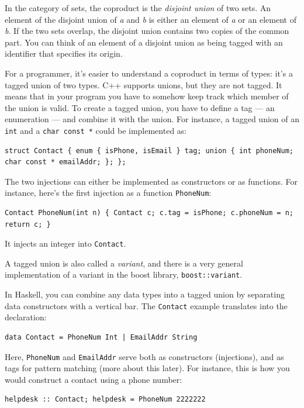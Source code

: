 In the category of sets, the coproduct is the \emph{disjoint union} of
two sets. An element of the disjoint union of \emph{a} and \emph{b} is
either an element of \emph{a} or an element of \emph{b}. If the two sets
overlap, the disjoint union contains two copies of the common part. You
can think of an element of a disjoint union as being tagged with an
identifier that specifies its origin.

For a programmer, it's easier to understand a coproduct in terms of
types: it's a tagged union of two types. C++ supports unions, but they
are not tagged. It means that in your program you have to somehow keep
track which member of the union is valid. To create a tagged union, you
have to define a tag --- an enumeration --- and combine it with the
union. For instance, a tagged union of an \texttt{int} and a
\texttt{char\ const\ *} could be implemented as:

\begin{verbatim}
struct Contact { enum { isPhone, isEmail } tag; union { int phoneNum; char const * emailAddr; }; };
\end{verbatim}

The two injections can either be implemented as constructors or as
functions. For instance, here's the first injection as a function
\texttt{PhoneNum}:

\begin{verbatim}
Contact PhoneNum(int n) { Contact c; c.tag = isPhone; c.phoneNum = n; return c; }
\end{verbatim}

It injects an integer into \texttt{Contact}.

A tagged union is also called a \emph{variant}, and there is a very
general implementation of a variant in the boost library,
\texttt{boost::variant}.

In Haskell, you can combine any data types into a tagged union by
separating data constructors with a vertical bar. The \texttt{Contact}
example translates into the declaration:

\begin{verbatim}
data Contact = PhoneNum Int | EmailAddr String
\end{verbatim}

Here, \texttt{PhoneNum} and \texttt{EmailAddr} serve both as
constructors (injections), and as tags for pattern matching (more about
this later). For instance, this is how you would construct a contact
using a phone number:

\begin{verbatim}
helpdesk :: Contact; helpdesk = PhoneNum 2222222
\end{verbatim}

